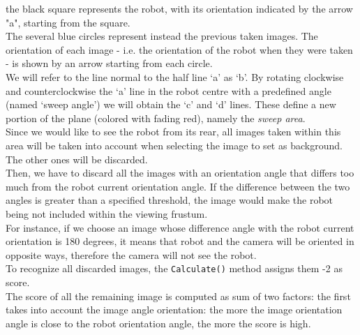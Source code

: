 the black square represents the robot, with its orientation 
indicated by the arrow "a", starting from the square.
\\
The several blue circles represent instead the previous 
taken images. The orientation of each image - i.e. the 
orientation of the robot when they were taken - 
is shown by an arrow starting from each circle.
\\
We will refer to the line normal to the half line `a' as `b'. 
By rotating clockwise and counterclockwise the `a' line in 
the robot centre with a predefined angle (named `sweep angle')
we will obtain the `c' and `d' lines. These define a new 
portion of the plane (colored with fading red), namely the 
\textit{sweep area}.
\\
Since we would like to see the robot from its rear, 
all images taken within this area will be taken into account
when selecting the image to set as background.
The other ones will be discarded.
\\
Then, we have to discard all the images with an orientation 
angle that differs too much from the robot current orientation angle. 
If the difference between the two angles is greater than a specified 
threshold, the image would make the robot being not included 
within the viewing frustum.
\\
For instance, if we choose an image whose difference angle with 
the robot current orientation is 180 degrees, it means that robot and 
the camera will be oriented in opposite ways, 
therefore the camera will not see the robot.
\\
To recognize all discarded images, the \texttt{Calculate()} method 
assigns them -2 as score.
\\
The score of all the remaining image is computed as sum 
of two factors:
the first takes into account the image angle orientation: 
the more the image orientation angle is close to the 
robot orientation angle, the more the score is high.
